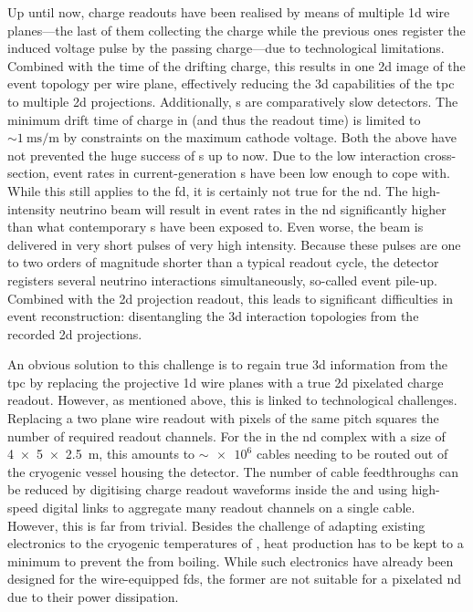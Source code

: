 Up until now, \lartpc{} charge readouts have been realised by means of multiple \gls{1d} wire planes---the last of them collecting the charge while the previous ones register the induced voltage pulse by the passing charge---due to technological limitations.
Combined with the time of the drifting charge, this results in one \gls{2d} image of the event topology per wire plane, effectively reducing the \gls{3d} capabilities of the \gls{tpc} to multiple \gls{2d} projections.
Additionally, \lartpc{}s are comparatively slow detectors.
The minimum drift time of charge in \lar{} (and thus the readout time) is limited to $\sim{\SI{1}{\milli\second\per\metre}}$ by constraints on the maximum cathode voltage.
Both the above have not prevented the huge success of \lartpc{}s up to now.
Due to the low interaction cross-section, event rates in current-generation \lartpc{}s have been low enough to cope with.
While this still applies to the \dune{} \gls{fd}, it is certainly not true for the \gls{nd}.
The high-intensity neutrino beam will result in event rates in the \gls{nd} significantly higher than what contemporary \lartpc{}s have been exposed to.
Even worse, the beam is delivered in very short pulses of very high intensity.
Because these pulses are one to two orders of magnitude shorter than a typical \lartpc{} readout cycle, the detector registers several neutrino interactions simultaneously, so-called event pile-up.
Combined with the \gls{2d} projection readout, this leads to significant difficulties in event reconstruction: disentangling the \gls{3d} interaction topologies from the recorded \gls{2d} projections.

An obvious solution to this challenge is to regain true \gls{3d} information from the \gls{tpc} by replacing the projective \gls{1d} wire planes with a true \gls{2d} pixelated charge readout.
However, as mentioned above, this is linked to technological challenges.
Replacing a two plane wire readout with pixels of the same pitch squares the number of required readout channels.
For the \lartpc{} in the \dune{} \gls{nd} complex with a size of \SI{4 x 5 x 2.5}{\metre}, this amounts to $\sim{\num{e6}}$ cables needing to be routed out of the cryogenic vessel housing the detector.
The number of cable feedthroughs can be reduced by digitising charge readout waveforms inside the \lar{} and using high-speed digital links to aggregate many readout channels on a single cable.
However, this is far from trivial.
Besides the challenge of adapting existing electronics to the cryogenic temperatures of \lar{}, heat production has to be kept to a minimum to prevent the \lar{} from boiling.
While such electronics have already been designed for the wire-equipped \glspl{fd}, the former are not suitable for a pixelated \gls{nd} due to their power dissipation.

